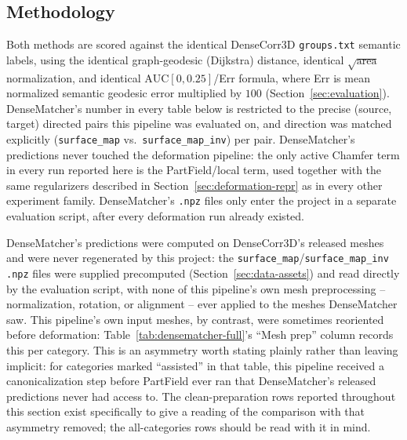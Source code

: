 \documentclass{article}
\begin{document}
\subsection{Methodology}

Both methods are scored against the identical DenseCorr3D \texttt{groups.txt} semantic labels,
using the identical graph-geodesic (Dijkstra) distance, identical $\sqrt{\mathrm{area}}$
normalization, and identical $\mathrm{AUC}[0,0.25]$/Err formula, where Err is mean normalized
semantic geodesic error multiplied by $100$ (Section~\ref{sec:evaluation}).
DenseMatcher's number in every table below is restricted to the precise (source, target) directed
pairs this pipeline was evaluated on, and direction was
matched explicitly (\texttt{surface\_map} vs.\ \texttt{surface\_map\_inv}) per pair. DenseMatcher's predictions never touched the deformation pipeline: the only active Chamfer
term in every run reported here is the PartField/local term, used
together with the same regularizers described in Section~\ref{sec:deformation-repr} as in every
other experiment family. DenseMatcher's \texttt{.npz} files only enter the project in a separate
evaluation script, after every deformation run already existed.

DenseMatcher's predictions were computed on DenseCorr3D's released meshes and were never
regenerated by this project: the \texttt{surface\_map}/\texttt{surface\_map\_inv} \texttt{.npz}
files were supplied precomputed (Section~\ref{sec:data-assets}) and read directly by the evaluation
script, with none of this pipeline's own mesh preprocessing -- normalization, rotation, or
alignment -- ever applied to the meshes DenseMatcher saw. This pipeline's own input meshes, by
contrast, were sometimes reoriented before deformation: Table~\ref{tab:densematcher-full}'s ``Mesh
prep'' column records this per category. This is an asymmetry worth stating plainly rather than
leaving implicit: for categories marked ``assisted'' in that table, this pipeline received a
canonicalization step before PartField ever ran that DenseMatcher's released predictions never had
access to. The clean-preparation rows reported throughout this section exist specifically to give a
reading of the comparison with that asymmetry removed; the all-categories rows should be read with
it in mind.
\end{document}
